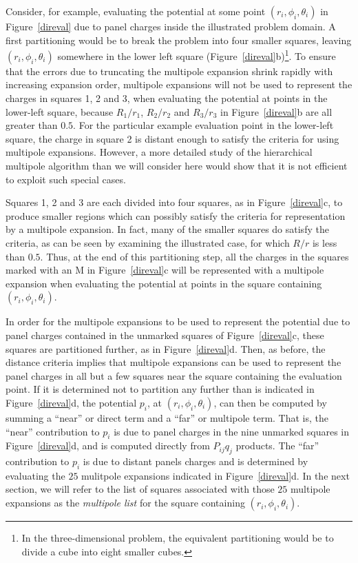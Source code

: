 Consider, for example, evaluating the potential at some point
$(r_i,\phi_i,\theta_i)$ in Figure~\ref{direval} due to panel charges
inside the illustrated problem domain. A first partitioning would be
to break the problem into four smaller squares, leaving
$(r_i,\phi_i,\theta_i)$ somewhere in the lower left square
(Figure~\ref{direval}b)\footnote{ In the three-dimensional problem,
the equivalent partitioning would be to divide a cube into eight
smaller cubes.}.  To ensure that the errors due to truncating the
multipole expansion shrink rapidly with increasing expansion order, multipole
expansions will not be used to represent the charges in squares 1, 2
and 3, when evaluating the potential at points in the lower-left
square, because $R_1/r_{1}$, $R_2/r_{2}$ and $R_3/r_{3}$ in
Figure~\ref{direval}b are all greater than $ 0.5 $.  For the
particular example evaluation point in the lower-left square, the
charge in square 2 is distant enough to satisfy the criteria for using
multipole expansions.  However, a more detailed study of the
hierarchical multipole algorithm than we will consider here would show
that it is not efficient to exploit such special cases.

Squares 1, 2 and 3 are each divided into four squares, as in
Figure~\ref{direval}c, to produce smaller regions which can
possibly satisfy the criteria for representation by a multipole
expansion. In fact, many of the smaller squares do satisfy the
criteria, as can be seen by examining the illustrated case, for which
$R/r $ is less than $0.5$.  Thus, at the end of this
partitioning step, all the charges in 
the squares marked with an M in Figure~\ref{direval}c will 
be represented with a 
multipole expansion when evaluating
the potential at points in the square containing $(r_i,\phi_i,\theta_i)$.

In order for the multipole expansions to be used to represent the potential
due to panel charges contained in the unmarked squares of
Figure~\ref{direval}c, these squares are partitioned further, as in
Figure~\ref{direval}d.  Then, as before, the distance criteria implies that
multipole expansions can be used to represent the panel
charges in all but a few squares near the square containing the
evaluation point.  If it is determined not to partition any further
than is indicated in Figure~\ref{direval}d, the potential $p_i$, at
$(r_i,\phi_i,\theta_i)$, can then be computed by summing a ``near'' or
direct term and a ``far'' or multipole term. That is, the ``near''
contribution to $ p_i $ is due to panel charges in the nine unmarked
squares in Figure~\ref{direval}d, and is computed directly from
$P_{ij}q_j$ products.  The ``far'' contribution to $ p_i $ is due to
distant panels charges and is determined by evaluating the $ 25 $
mulitpole expansions indicated in Figure~\ref{direval}d.  In the next
section, we will refer to the list of squares associated with those
$25 $ multipole expansions as the {\it multipole list } for the square
containing $(r_i,\phi_i,\theta_i)$.

